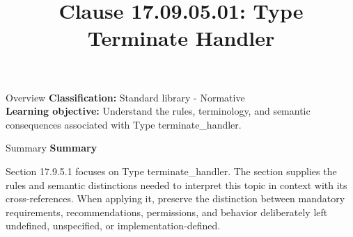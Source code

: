 \documentclass[10pt,letterpaper]{article}
\title{Clause 17.09.05.01: Type Terminate Handler}
\author{}
\date{}
\begin{document}
\maketitle
\begin{CornellOverviewBox}{Overview}
\textbf{Classification:} Standard library - Normative\\[2pt]
\textbf{Learning objective:} Understand the rules, terminology, and semantic consequences associated with Type terminate\_handler.
\end{CornellOverviewBox}\begin{CornellSummaryBox}{Summary}
{\sffamily\bfseries\color{Accent} Summary}\par\vspace{3pt}Section 17.9.5.1 focuses on Type terminate\_handler. The section supplies the rules and semantic distinctions needed to interpret this topic in context with its cross-references. When applying it, preserve the distinction between mandatory requirements, recommendations, permissions, and behavior deliberately left undefined, unspecified, or implementation-defined.
\end{CornellSummaryBox}
\end{document}
